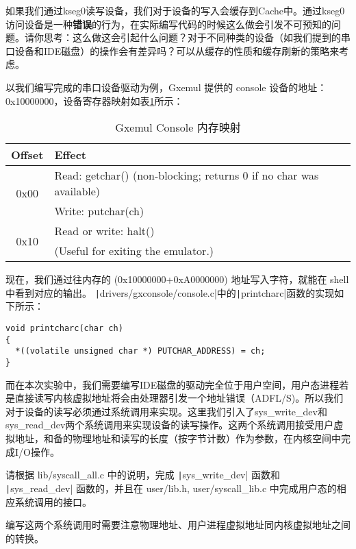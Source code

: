 \begin{thinking}\label{think-fs-cache}

如果我们通过kseg0读写设备，我们对于设备的写入会缓存到Cache中。通过kseg0访问设备是一种\textbf{错误}的行为，在实际编写代码的时候这么做会引发不可预知的问题。请你思考：这么做这会引起什么问题？对于不同种类的设备（如我们提到的串口设备和IDE磁盘）的操作会有差异吗？可以从缓存的性质和缓存刷新的策略来考虑。
\end{thinking}

以我们编写完成的串口设备驱动为例，Gxemul 提供的 console 设备的地址：0x10000000，设备寄存器映射如表\ref{lab5-table-console-mem-map}所示：

\begin{table}[htbp]
\caption{Gxemul Console 内存映射}\label{lab5-table-console-mem-map}
\centering
\begin{tabular}{|c|l|}
  \hline
    Offset & Effect \\
  \hline
  \multirow{2}{*}{0x00} & Read: getchar() (non-blocking; returns 0 if no char was available) \\
  \cline{2-2}
    & Write: putchar(ch) \\
  \hline
    \multirow{2}{*}{0x10} & Read or write: halt() \\
  \cline{2-2}
    & (Useful for exiting the emulator.) \\
  \hline
\end{tabular}
\end{table}

现在，我们通过往内存的 (0x10000000+0xA0000000) 地址写入字符，就能在 shell 中看到对应的输出。
\texttt|drivers/gxconsole/console.c|中的\texttt|printcharc|函数的实现如下所示：

\begin{verbatim}
void printcharc(char ch)
{
  *((volatile unsigned char *) PUTCHAR_ADDRESS) = ch;
}
\end{verbatim}

而在本次实验中，我们需要编写IDE磁盘的驱动完全位于用户空间，用户态进程若是直接读写内核虚拟地址将会由处理器引发一个地址错误（ADFL/S)。所以我们对于设备的读写必须通过系统调用来实现。这里我们引入了sys\_write\_dev和sys\_read\_dev两个系统调用来实现设备的读写操作。这两个系统调用接受用户虚拟地址，和备的物理地址和读写的长度（按字节计数）作为参数，在内核空间中完成I/O操作。

\begin{exercise}
请根据 lib/syscall\_all.c 中的说明，完成 \texttt|sys_write_dev| 函数和 \texttt|sys_read_dev| 函数的，并且在 user/lib.h, user/syscall\_lib.c 中完成用户态的相应系统调用的接口。

编写这两个系统调用时需要注意物理地址、用户进程虚拟地址同内核虚拟地址之间的转换。
\end{exercise}

